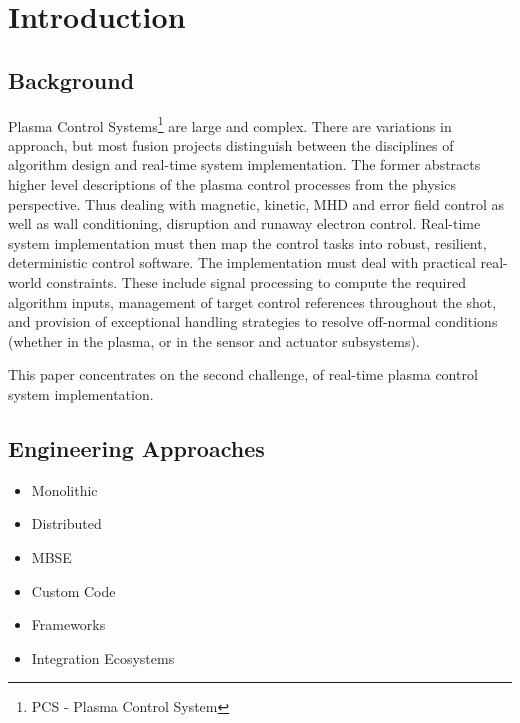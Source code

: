 \documentclass[preprint,12pt]{elsarticle}
\begin{document}

\section{Introduction}
\label{sec:intro}

\subsection{Background}

Plasma Control Systems\footnote{PCS - Plasma Control System} are large and complex.
There are variations in approach, but most fusion projects distinguish between
the disciplines of algorithm design and real-time system implementation.
The former abstracts higher level descriptions of the plasma control processes
from the physics perspective. Thus dealing with magnetic, kinetic, MHD and error field
control as well as wall conditioning, disruption and runaway electron control.
Real-time system implementation must then map the control tasks into robust, resilient,
deterministic control software. The implementation must deal with practical real-world
constraints. These include signal processing to compute the required algorithm
inputs, management of target control references throughout the shot, and provision 
of exceptional handling strategies to resolve off-normal conditions (whether in the plasma,
or in the sensor and actuator subsystems).


This paper concentrates on the second challenge, of real-time plasma control system implementation.


\subsection{Engineering Approaches}

\begin{itemize}
\item{Monolithic}
\item{Distributed}
\item{MBSE}
\item{Custom Code}
\item{Frameworks}
\item{Integration Ecosystems}
\end{itemize}
\end{document}

